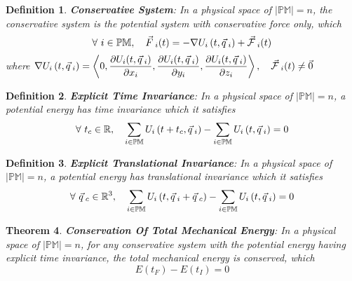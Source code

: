 \documentclass[12pt]{amsart}
\newtheorem{theorem}{Theorem}[section]
\newtheorem{definition}[theorem]{Definition}
\let\oldvec\vec
\renewcommand{\vec}[1]{\oldvec{#1}\hspace{0.1em}}
\begin{document}
\begin{definition}
    \textbf{Conservative System}: In a physical space of $\left | \mathbb{PM} \right | = n$, the conservative system is the potential system with conservative force only, which $$\forall \  i \in \mathbb{PM}, \quad \vec{F}_i (t) = - \nabla U_i \left ( t, \vec{q}_i  \right) + \vec{\mathcal{F}}_i(t)$$ where $  \nabla  U_i \left ( t, \vec{q}_i \right )  = \left < 0, \dfrac{\partial U_i (t, \vec{q}_i)}{\partial x_i}, \dfrac{\partial U_i (t, \vec{q}_i)}{\partial y_i}, \dfrac{\partial U_i (t, \vec{q}_i)}{\partial z_i} \right >, \quad \vec{\mathcal{F}}_i (t) \ne \vec{0}$
\end{definition}

\begin{definition}
    \textbf{Explicit Time Invariance}: In a physical space of $\left | \mathbb{PM} \right | = n$, a potential energy has time invariance which it satisfies $$\forall \  t_c \in \mathbb{R}, \quad  \sum_{i \in \mathbb{PM}}   U_i \left ( t+t_c, \vec{q}_i \right ) - \sum_{i \in \mathbb{PM}}   U_i \left ( t, \vec{q}_i \right )  = 0 $$
\end{definition}

\begin{definition}
    \textbf{Explicit Translational Invariance}: In a physical space of $\left | \mathbb{PM} \right | = n$, a potential energy has translational invariance which it satisfies $$\forall \  \vec{q}_c \in \mathbb{R}^3, \quad  \sum_{i \in \mathbb{PM}}   U_i \left ( t, \vec{q}_i + \vec{q}_c \right ) - \sum_{i \in \mathbb{PM}}   U_i \left ( t, \vec{q}_i \right ) = 0 $$
\end{definition}

\begin{theorem}
    \textbf{Conservation Of Total Mechanical Energy}: In a physical space of $\left | \mathbb{PM} \right | = n$, for any conservative system with the potential energy having explicit time invariance, the total mechanical energy is conserved, which $$ E(t_F) -  E(t_I) = 0 $$
\end{theorem}
\end{document}
